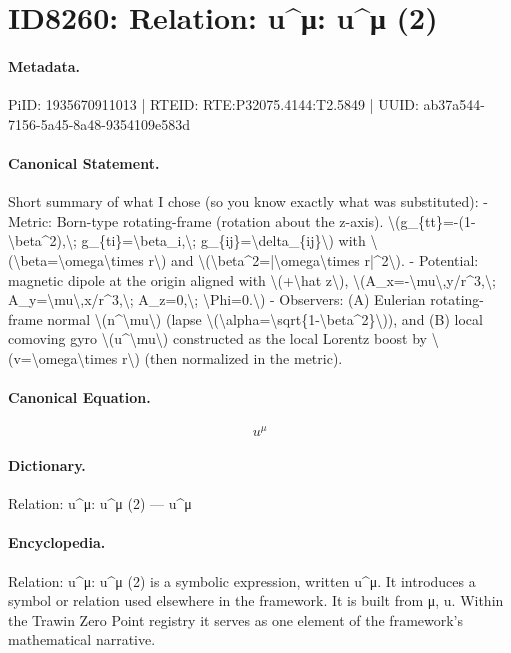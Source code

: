 \section*{ID8260: Relation: u\textasciicircum{}μ: u\textasciicircum{}μ (2)}
\paragraph{Metadata.}
PiID: 1935670911013 | RTEID: RTE:P32075.4144:T2.5849 | UUID: ab37a544-7156-5a45-8a48-9354109e583d

\paragraph{Canonical Statement.}
Short summary of what I chose (so you know exactly what was substituted): - Metric: Born-type rotating-frame (rotation about the z-axis). \textbackslash{}(g\_\{tt\}=-(1-\textbackslash{}beta\textasciicircum{}2),\textbackslash{}; g\_\{ti\}=\textbackslash{}beta\_i,\textbackslash{}; g\_\{ij\}=\textbackslash{}delta\_\{ij\}\textbackslash{}) with \textbackslash{}(\textbackslash{}beta=\textbackslash{}omega\textbackslash{}times r\textbackslash{}) and \textbackslash{}(\textbackslash{}beta\textasciicircum{}2=|\textbackslash{}omega\textbackslash{}times r|\textasciicircum{}2\textbackslash{}). - Potential: magnetic dipole at the origin aligned with \textbackslash{}(+\textbackslash{}hat z\textbackslash{}), \textbackslash{}(A\_x=-\textbackslash{}mu\textbackslash{},y/r\textasciicircum{}3,\textbackslash{}; A\_y=\textbackslash{}mu\textbackslash{},x/r\textasciicircum{}3,\textbackslash{}; A\_z=0,\textbackslash{}; \textbackslash{}Phi=0.\textbackslash{}) - Observers: (A) Eulerian rotating-frame normal \textbackslash{}(n\textasciicircum{}\textbackslash{}mu\textbackslash{}) (lapse \textbackslash{}(\textbackslash{}alpha=\textbackslash{}sqrt\{1-\textbackslash{}beta\textasciicircum{}2\}\textbackslash{})), and (B) local comoving gyro \textbackslash{}(u\textasciicircum{}\textbackslash{}mu\textbackslash{}) constructed as the local Lorentz boost by \textbackslash{}(v=\textbackslash{}omega\textbackslash{}times r\textbackslash{}) (then normalized in the metric).

\paragraph{Canonical Equation.}
\[
u^\mu
\]

\paragraph{Dictionary.}
Relation: u\textasciicircum{}μ: u\textasciicircum{}μ (2) — u\textasciicircum{}μ

\paragraph{Encyclopedia.}
Relation: u\textasciicircum{}μ: u\textasciicircum{}μ (2) is a symbolic expression, written u\textasciicircum{}μ. It introduces a symbol or relation used elsewhere in the framework. It is built from μ, u. Within the Trawin Zero Point registry it serves as one element of the framework's mathematical narrative.
